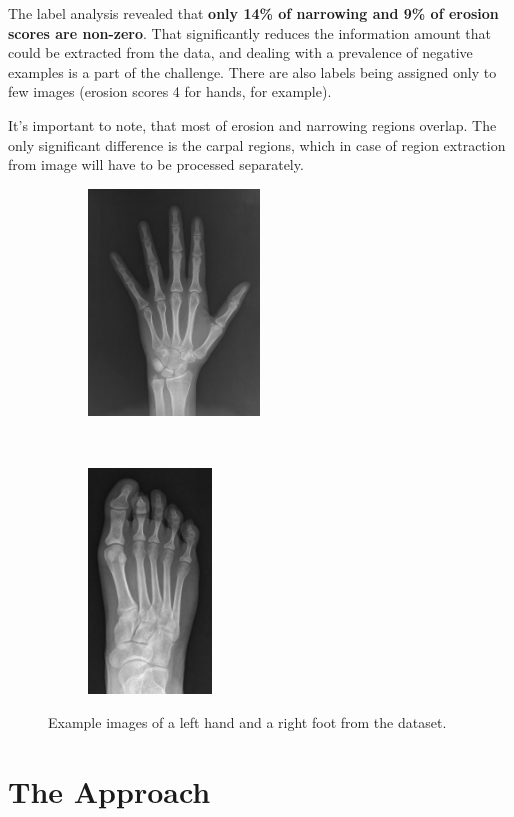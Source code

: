 \documentclass[thesis=B,english]{FITthesis}[2019/12/23]
\begin{document}
The label analysis revealed that \textbf{only 14\% of narrowing and 9\% of erosion scores are non-zero}. That significantly reduces the information amount that could be extracted from the data, and dealing with a prevalence of negative examples is a part of the challenge. There are also labels being assigned only to few images (erosion scores 4 for hands, for example).

It's important to note, that most of erosion and narrowing regions overlap. The only significant difference is the carpal regions, which in case of region extraction from image will have to be processed separately.

\begin{figure}[h]
	\centering
	
	\begin{subfigure}[b]{.48\textwidth}
		\centering
		\includegraphics[height = 6cm]{images/UAB002-LH.jpg}
	\end{subfigure}
	~
	\begin{subfigure}[b]{.48\textwidth}
		\centering
		\includegraphics[height = 6cm]{images/UAB002-RF.jpg}
	\end{subfigure}
	
	\caption{Example images of a left hand and a right foot from the dataset.}
\end{figure}

\section{The Approach}
\end{document}
